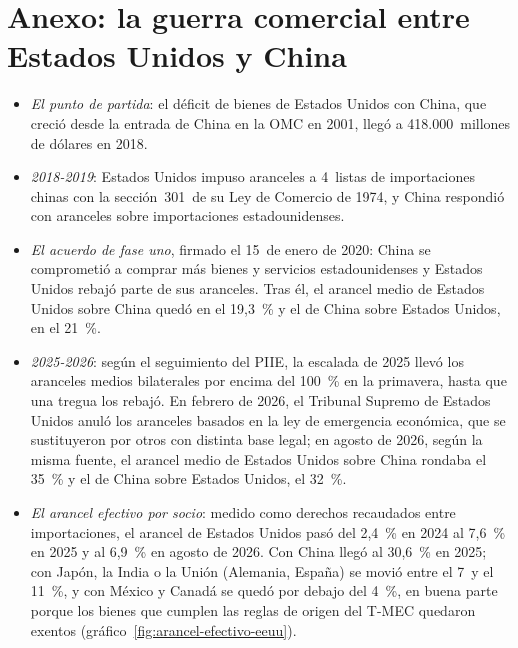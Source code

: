 \documentclass[11pt]{article}
\begin{document}
\section{Anexo: la guerra comercial entre Estados Unidos y China}\label{anexo:china}

\begin{itemize}
\item \emph{El punto de partida}: el déficit de bienes de Estados Unidos con China, que creció desde la entrada de China en la OMC en 2001, llegó a 418.000~millones de dólares en 2018\nocite{CensusBureau2026China}.
\item \emph{2018-2019}: Estados Unidos impuso aranceles a 4~listas de importaciones chinas con la sección~301~de su Ley de Comercio de 1974\nocite{USTR2026Seccion301}, y China respondió con aranceles sobre importaciones estadounidenses.
\item \emph{El acuerdo de fase uno}, firmado el 15~de enero de 2020\nocite{USTR2020FaseUno}: China se comprometió a comprar más bienes y servicios estadounidenses y Estados Unidos rebajó parte de sus aranceles. Tras él, el arancel medio de Estados Unidos sobre China quedó en el 19,3~\% y el de China sobre Estados Unidos, en el 21~\%\nocite{Bown2026Chart}.
\item \emph{2025-2026}: según el seguimiento del PIIE, la escalada de 2025 llevó los aranceles medios bilaterales por encima del 100~\% en la primavera, hasta que una tregua los rebajó\nocite{Bown2026Chart}. En febrero de 2026, el Tribunal Supremo de Estados Unidos anuló los aranceles basados en la ley de emergencia económica\nocite{JonesDay2026IEEPA}, que se sustituyeron por otros con distinta base legal; en agosto de 2026, según la misma fuente, el arancel medio de Estados Unidos sobre China rondaba el 35~\% y el de China sobre Estados Unidos, el 32~\%\nocite{Bown2026Chart}.
\item \emph{El arancel efectivo por socio}: medido como derechos recaudados entre importaciones, el arancel de Estados Unidos pasó del 2,4~\% en 2024 al 7,6~\% en 2025 y al 6,9~\% en agosto de 2026. Con China llegó al 30,6~\% en 2025; con Japón, la India o la Unión (Alemania, España) se movió entre el 7~y el 11~\%, y con México y Canadá se quedó por debajo del 4~\%, en buena parte porque los bienes que cumplen las reglas de origen del T-MEC quedaron exentos (gráfico~\ref{fig:arancel-efectivo-eeuu})\nocite{USAFacts2026Arancel}.
\end{itemize}
\end{document}
